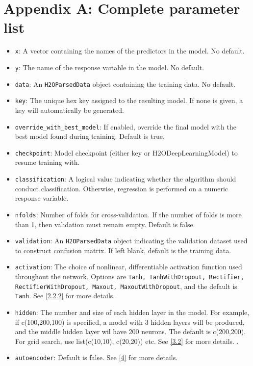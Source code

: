 \documentclass[11pt]{article}
\begin{document}
\newpage

\section{Appendix A: Complete parameter list}
\begin{itemize}
\item \texttt{x}: A vector containing the names of the predictors in the model. No default.
\item \texttt{y}: The name of the response variable in the model. No default.
\item \texttt{data}: An \texttt{H2OParsedData} object containing the training data. No default.
\item \texttt{key}: The unique hex key assigned to the resulting model. If none is given, a key will automatically be generated.
\item \texttt{override\_with\_best\_model}: If enabled, override the final model with the best model found during training. Default is true.
\item \texttt{checkpoint}: Model checkpoint (either key or H2ODeepLearningModel) to resume training with.
\item \texttt{classification}: A logical value indicating whether the algorithm should conduct classification. Otherwise, regression is performed on a numeric response variable.
\item \texttt{nfolds}: Number of folds for cross-validation. If the number of folds is more than 1, then validation must remain empty. Default is false.
\item \texttt{validation}: An \texttt{H2OParsedData} object indicating the validation dataset used to construct confusion matrix. If left blank, default is the training data.
\item \texttt{activation}: The choice of nonlinear, differentiable activation function used throughout the network. Options are \texttt{Tanh, TanhWithDropout, Rectifier, RectifierWithDropout, Maxout, MaxoutWithDropout}, and the default is \texttt{Tanh}. See \ref{2.2.2} for more details.
\item \texttt{hidden}: The number and size of each hidden layer in the model. For example, if c(100,200,100) is specified, a model with 3 hidden layers will be produced, and the middle hidden layer wil have 200 neurons. The default is c(200,200). For grid search, use list(c(10,10), c(20,20)) etc. See \ref{3.2} for more details. .
\item \texttt{autoencoder}: Default is false. See \ref{4} for more details.

\end{itemize}
\end{document}
